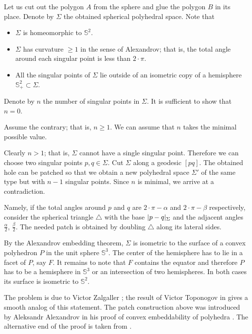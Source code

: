 Let us cut out the polygon $A$ from the sphere and glue the polygon $B$ in its place.
Denote by $\Sigma$ the obtained spherical polyhedral space.
Note that 
\begin{itemize}
\item $\Sigma$ is homeomorphic to $\mathbb S^2$.
\item $\Sigma$ has curvature $\ge 1$ in the sense of Alexandrov; that is, the total angle around each singular point is less than $2\cdot \pi$.
\item All the singular points of $\Sigma$ 
lie outside of an isometric copy of a hemisphere $\mathbb{S}^2_+\subset \Sigma$.
\end{itemize}

Denote by $n$ the number of singular points in $\Sigma$.
It is sufficient to show that $n=0$.

Assume the contrary; that is, $n\ge 1$.
We can assume that $n$ takes the minimal possible value.

Clearly $n>1$;
that is, $\Sigma$ cannot have a single singular point.
Therefore we can choose two singular points $p,q\in \Sigma$.
Cut $\Sigma$ along a geodesic $[pq]$.
The obtained hole can be patched so that we obtain a new polyhedral space $\Sigma'$ of the same type but with $n-1$ singular points.
Since $n$ is minimal, we arrive at a contradiction.

Namely, if the total angles around $p$ and $q$ are $2\cdot \pi-\alpha$ and $2\cdot \pi-\beta$ respectively,
consider the spherical triangle $\triangle$ with the base $|p\z-q|_\Sigma$ and the adjacent angles $\tfrac\alpha2$, $\tfrac\beta2$. 
The needed patch is obtained by doubling $\triangle$ along its lateral sides.
\qeds

By the Alexandrov embedding theorem, $\Sigma$ is isometric to the surface of a convex polyhedron $P$ in the unit sphere $\mathbb S^3$. 
The center of the hemisphere has to lie in a facet of $P$, say $F$.
It remains to note that $F$ contains the equator and therefore $P$ has to be a hemisphere in $\mathbb S^3$ or an intersection of two hemispheres.
In both cases its surface is isometric to $\mathbb S^2$.
\qeds

The problem is due to Victor Zalgaller \cite{zalgaller-shperical-polygon};
the result of Victor Toponogov in \cite{toponogov} gives a smooth analog of this statement.
The patch construction above was introduced by 
Aleksandr Alexandrov
in his proof of convex embeddability of polyhedra
\cite[see VI, \S7 in][]{alexandrov1948}.
The alternative end of the proof is taken from \cite{panov-petrunin}.



